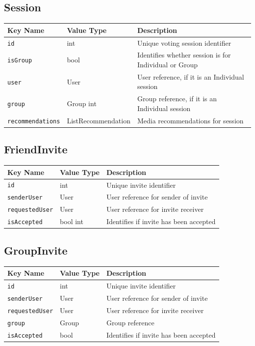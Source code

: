 \documentclass[12pt, titlepage]{article}
\begin{document}
\subsection{Session}
\begin{tabularx}{\textwidth}{|p{3.3cm}|p{4cm}|X|}
	\hline
	{\bf Key Name} & {\bf Value Type} & {\bf Description}\\
	\hline
	\verb_id_ & int & Unique voting session identifier\\
	\hline
	\verb_isGroup_ & bool & Identifies whether session is for Individual or Group\\
	\hline
	\verb_user_ & User & User reference, if it is an Individual session \\
	\hline
	\verb_group_ & Group \textlangle{}int\textrangle & Group reference, if it is an Individual session\\
	\hline
	\verb_recommendations_ & List\textlangle{}Recommendation\textrangle & Media recommendations for session \\
	\hline
\end{tabularx}

\subsection{FriendInvite}
\begin{tabularx}{\textwidth}{|p{3.3cm}|p{3cm}|X|}
	\hline
	{\bf Key Name} & {\bf Value Type} & {\bf Description}\\
	\hline
	\verb_id_ & int & Unique invite identifier\\
	\hline
	\verb_senderUser_ & User & User reference for sender of invite \\
	\hline
	\verb_requestedUser_ & User & User reference for invite receiver \\
	\hline
	\verb_isAccepted_ & bool \textlangle{}int\textrangle & Identifies if invite has been accepted \\
	\hline
\end{tabularx}

\subsection{GroupInvite}
\begin{tabularx}{\textwidth}{|p{3.3cm}|p{3cm}|X|}
	\hline
	{\bf Key Name} & {\bf Value Type} & {\bf Description}\\
	\hline
	\verb_id_ & int & Unique invite identifier\\
	\hline
	\verb_senderUser_ & User & User reference for sender of invite \\
	\hline
	\verb_requestedUser_ & User & User reference for invite receiver \\
	\hline
	\verb_group_ & Group & Group reference \\
	\hline
	\verb_isAccepted_ & bool  & Identifies if invite has been accepted \\
	\hline
\end{tabularx}
\end{document}
